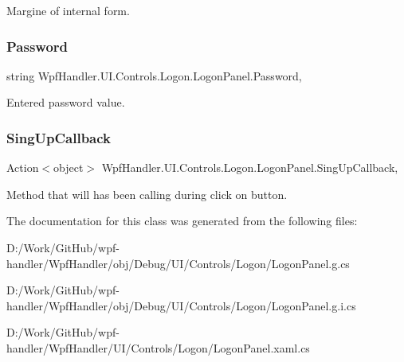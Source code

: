 Margine of internal form. 

\mbox{\label{class_wpf_handler_1_1_u_i_1_1_controls_1_1_logon_1_1_logon_panel_a2b5b8a76a045af6351be2ddaab3ebaf0}} 
\subsubsection{\texorpdfstring{Password}{Password}}
{\footnotesize\ttfamily string Wpf\+Handler.\+U\+I.\+Controls.\+Logon.\+Logon\+Panel.\+Password\hspace{0.3cm}{\ttfamily [get]}, {\ttfamily [set]}}



Entered password value. 

\mbox{\label{class_wpf_handler_1_1_u_i_1_1_controls_1_1_logon_1_1_logon_panel_a6fc870650cd4c39be458e1da94bc8d70}} 
\subsubsection{\texorpdfstring{Sing\+Up\+Callback}{SingUpCallback}}
{\footnotesize\ttfamily Action$<$object$>$ Wpf\+Handler.\+U\+I.\+Controls.\+Logon.\+Logon\+Panel.\+Sing\+Up\+Callback\hspace{0.3cm}{\ttfamily [get]}, {\ttfamily [set]}}



Method that will has been calling during click on button. 



The documentation for this class was generated from the following files\+:\begin{DoxyCompactItemize}
\item 
D\+:/\+Work/\+Git\+Hub/wpf-\/handler/\+Wpf\+Handler/obj/\+Debug/\+U\+I/\+Controls/\+Logon/Logon\+Panel.\+g.\+cs\item 
D\+:/\+Work/\+Git\+Hub/wpf-\/handler/\+Wpf\+Handler/obj/\+Debug/\+U\+I/\+Controls/\+Logon/Logon\+Panel.\+g.\+i.\+cs\item 
D\+:/\+Work/\+Git\+Hub/wpf-\/handler/\+Wpf\+Handler/\+U\+I/\+Controls/\+Logon/Logon\+Panel.\+xaml.\+cs\end{DoxyCompactItemize}
